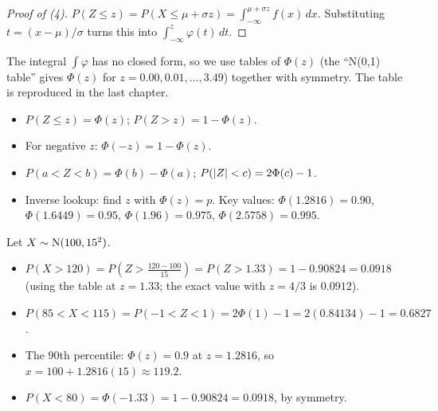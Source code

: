 \begin{proof}[Proof of (4)]
$P(Z\le z) = P(X\le\mu+\sigma z) = \int_{-\infty}^{\mu+\sigma z} f(x)\,dx$. Substituting
$t = (x-\mu)/\sigma$ turns this into $\int_{-\infty}^z \varphi(t)\,dt$.
\end{proof}

The integral $\int\varphi$ has no closed form, so we use tables of $\Phi(z)$ (the
``N(0,1) table'' gives $\Phi(z)$ for $z = 0.00, 0.01, \dots, 3.49$) together with
symmetry. The table is reproduced in the last chapter.

\begin{important}
\begin{itemize}
  \item $P(Z\le z) = \Phi(z)$; \quad $P(Z > z) = 1 - \Phi(z)$.
  \item For negative $z$: $\Phi(-z) = 1 - \Phi(z)$.
  \item $P(a<Z<b) = \Phi(b) - \Phi(a)$; \quad $P(\left\lvert Z \right\rvert < c) = 2\Phi(c) - 1$.
  \item Inverse lookup: find $z$ with $\Phi(z) = p$. Key values:
        $\Phi(1.2816) = 0.90$, $\Phi(1.6449) = 0.95$, $\Phi(1.96) = 0.975$,
        $\Phi(2.5758) = 0.995$.
\end{itemize}
\end{important}

\begin{example}[IQ scores]
Let $X\sim\operatorname{N}(100, 15^2)$.
\begin{itemize}
  \item $P(X > 120) = P\left(Z > \frac{120-100}{15}\right) = P(Z > 1.33) = 1 - 0.90824
        = 0.0918$ (using the table at $z = 1.33$; the exact value with $z=4/3$ is
        $0.0912$).
  \item $P(85 < X < 115) = P(-1 < Z < 1) = 2\Phi(1) - 1 = 2(0.84134) - 1 = 0.6827$.
  \item The 90th percentile: $\Phi(z) = 0.9$ at $z = 1.2816$, so
        $x = 100 + 1.2816(15) \approx 119.2$.
  \item $P(X < 80) = \Phi(-1.33) = 1 - 0.90824 = 0.0918$, by symmetry.
\end{itemize}
\end{example}

